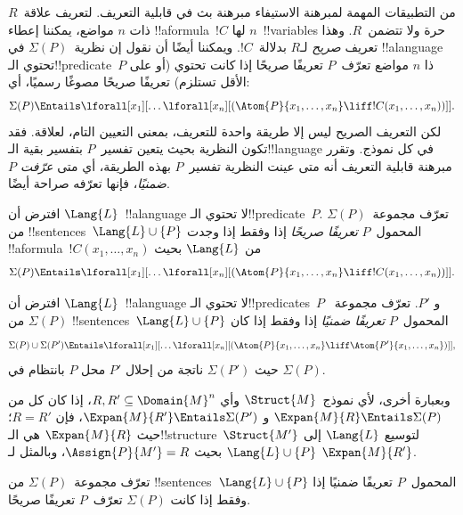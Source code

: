 \documentclass[../../../include/open-logic-section]{subfiles}
\begin{document}


من التطبيقات المهمة لمبرهنة الاستيفاء مبرهنة بث في قابلية التعريف.
لتعريف علاقة~$R$ ذات $n$ مواضع، يمكننا إعطاء !!a{formula}~$!C$ لها
$n$~!!{variable}s حرة ولا تتضمن~$R$. وهذا تعريف \emph{صريح} لـ$R$
بدلالة~$!C$. ويمكننا أيضًا أن نقول إن نظرية~$\Sigma(P)$ في !!a{language}
تحتوي الـ!!{predicate}~$P$ ذا $n$ مواضع تعرّف~$P$ تعريفًا صريحًا إذا
كانت تحتوي (أو على الأقل تستلزم) تعريفًا صريحًا مصوغًا رسميًا، أي:
\[
\Sigma(P) \Entails \lforall[x_1][\dots
  \lforall[x_n][(\Atom{P}{x_1,\dots, x_n} \liff !C(x_1, \dots,
    x_n))]].
\]
لكن التعريف الصريح ليس إلا طريقة واحدة للتعريف، بمعنى التعيين التام،
لعلاقة. فقد تكون النظرية بحيث يتعين تفسير~$P$ بتفسير بقية الـ!!{language}
في كل نموذج. وتقرر مبرهنة قابلية التعريف أنه متى عينت النظرية تفسير~$P$
بهذه الطريقة، أي متى \emph{عرّفت $P$ ضمنيًا}، فإنها تعرّفه صراحة أيضًا.

\begin{defn}
افترض أن $\Lang{L}$~!!a{language} لا تحتوي الـ!!{predicate}~$P$.
تعرّف مجموعة~$\Sigma(P)$ من !!{sentence}s~$\Lang{L} \cup \{P\}$
المحمول~$P$ \emph{تعريفًا صريحًا} إذا وفقط إذا وجدت
!!a{formula}~$!C(x_1,\dots,x_n)$ من $\Lang{L}$ بحيث
\[
\Sigma(P) \Entails \lforall[x_1][\dots
  \lforall[x_n][(\Atom{P}{x_1,\dots, x_n} \liff !C(x_1, \dots,
    x_n))]].
\]
\end{defn}

\begin{defn}
افترض أن $\Lang{L}$~!!a{language} لا تحتوي الـ!!{predicate}s~$P$ و
$P'$. تعرّف مجموعة~$\Sigma(P)$ من !!{sentence}s~$\Lang{L} \cup \{P\}$
المحمول~$P$ \emph{تعريفًا ضمنيًا} إذا وفقط إذا كان
\[
\Sigma(P) \cup \Sigma(P') \Entails \lforall[x_1][\dots
  \lforall[x_n][(\Atom{P}{x_1,\dots, x_n} \liff \Atom{P'}{x_1,\dots,
      x_n})]],
\]
حيث $\Sigma(P')$ ناتجة من إحلال $P'$ محل $P$ بانتظام في $\Sigma(P)$.
\end{defn}

وبعبارة أخرى، لأي نموذج~$\Struct{M}$ وأي
$R,R' \subseteq \Domain{M}^n$، إذا كان كل من
$\Expan{M}{R} \Entails \Sigma(P)$ و
$\Expan{M}{R'} \Entails \Sigma(P')$، فإن $R=R'$؛ حيث
$\Expan{M}{R}$ هي الـ!!{structure}~$\Struct{M'}$ لتوسيع $\Lang{L}$
إلى $\Lang{L} \cup \{P\}$ بحيث $\Assign{P}{M'}=R$، وبالمثل لـ
$\Expan{M}{R'}$.

\begin{thm}
تعرّف مجموعة~$\Sigma(P)$ من !!{sentence}s~$\Lang{L} \cup \{P\}$
المحمول~$P$ تعريفًا ضمنيًا إذا وفقط إذا كانت $\Sigma(P)$ تعرّف~$P$
تعريفًا صريحًا.
\end{thm}
\end{document}
